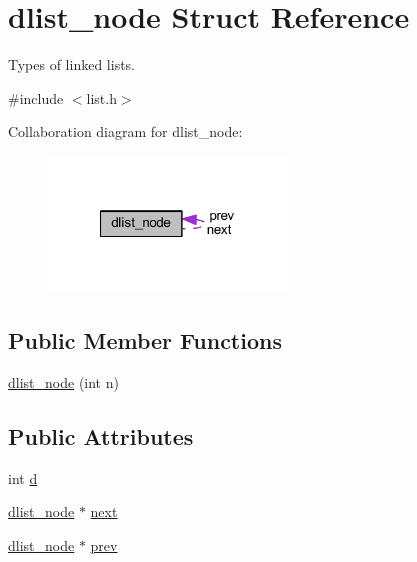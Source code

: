 \hypertarget{structdlist__node}{\section{dlist\-\_\-node Struct Reference}
\label{structdlist__node}
}


Types of linked lists.  




{\ttfamily \#include $<$list.\-h$>$}



Collaboration diagram for dlist\-\_\-node\-:\nopagebreak
\begin{figure}[H]
\begin{center}
\leavevmode
\includegraphics[width=179pt]{structdlist__node__coll__graph}
\end{center}
\end{figure}
\subsection*{Public Member Functions}
\begin{DoxyCompactItemize}
\item 
\hyperlink{structdlist__node_a2840ad5bcba6f82786afab43f775d81f}{dlist\-\_\-node} (int n)
\end{DoxyCompactItemize}
\subsection*{Public Attributes}
\begin{DoxyCompactItemize}
\item 
int \hyperlink{structdlist__node_abbcd93ff39230885440749f682aab79c}{d}
\item 
\hyperlink{structdlist__node}{dlist\-\_\-node} $\ast$ \hyperlink{structdlist__node_a446668c64b6554a885446e7766a0fca1}{next}
\item 
\hyperlink{structdlist__node}{dlist\-\_\-node} $\ast$ \hyperlink{structdlist__node_a63c2ec1d9d1d654ef30f01eb37ad5ff5}{prev}
\end{DoxyCompactItemize}


